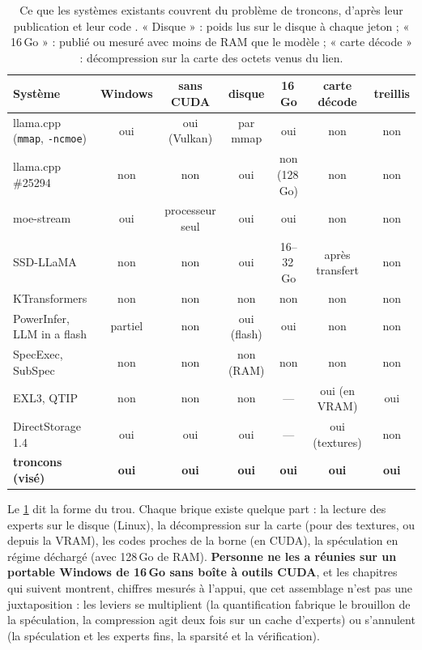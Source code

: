 \begin{table}[ht]
\centering\small
\caption[Ce que les systèmes existants couvrent du problème de troncons]{Ce que les systèmes existants couvrent du problème de troncons, d'après leur publication et leur code \litt. « Disque » : poids lus sur le disque à chaque jeton ; « 16\,Go » : publié ou mesuré avec moins de RAM que le modèle ; « carte décode » : décompression sur la carte des octets venus du lien.}
\label{tab:positionnement}
\begin{tabular}{@{}lcccccc@{}}
\toprule
Système & Windows & sans CUDA & disque & 16\,Go & carte décode & treillis \\
\midrule
llama.cpp (\texttt{mmap}, \texttt{-ncmoe}) & oui & oui (Vulkan) & par mmap & oui & non & non \\
llama.cpp \#25294 & non & non & oui & non (128\,Go) & non & non \\
moe-stream & oui & processeur seul & oui & oui & non & non \\
SSD-LLaMA & non & non & oui & 16--32\,Go & après transfert & non \\
KTransformers & non & non & non & non & non & non \\
PowerInfer, LLM in a flash & partiel & non & oui (flash) & oui & non & non \\
SpecExec, SubSpec & non & non & non (RAM) & non & non & non \\
EXL3, QTIP & non & non & non & --- & oui (en VRAM) & oui \\
DirectStorage 1.4 & oui & oui & oui & --- & oui (textures) & non \\
\midrule
\textbf{troncons (visé)} & \textbf{oui} & \textbf{oui} & \textbf{oui} & \textbf{oui} & \textbf{oui} & \textbf{oui} \\
\bottomrule
\end{tabular}
\end{table}

Le \cref{tab:positionnement} dit la forme du trou. Chaque brique existe quelque part : la lecture des experts sur le disque (Linux), la décompression sur la carte (pour des textures, ou depuis la VRAM), les codes proches de la borne (en CUDA), la spéculation en régime déchargé (avec 128\,Go de RAM). \textbf{Personne ne les a réunies sur un portable Windows de 16\,Go sans boîte à outils CUDA}, et les chapitres qui suivent montrent, chiffres mesurés à l'appui, que cet assemblage n'est pas une juxtaposition : les leviers se multiplient (la quantification fabrique le brouillon de la spéculation, la compression agit deux fois sur un cache d'experts) ou s'annulent (la spéculation et les experts fins, la sparsité et la vérification).
